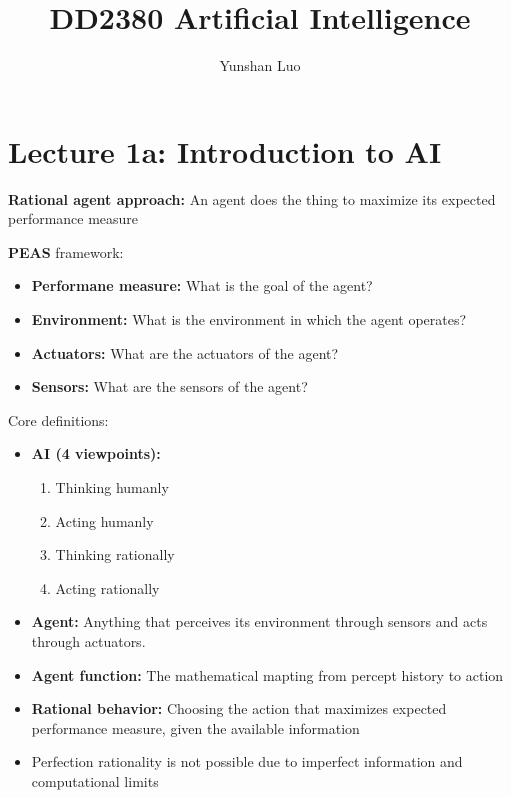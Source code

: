 \documentclass[12pt,a4paper]{article}
\begin{document}
\author{Yunshan Luo}
\title{DD2380 Artificial Intelligence}
\maketitle
\newpage

\section{Lecture 1a: Introduction to AI}
\textbf{Rational agent approach:} An agent does the thing to maximize its expected performance measure

\vspace{10pt}
\textbf{PEAS} framework:
\begin{itemize}
    \item \textbf{Performane measure:} What is the goal of the agent?
    \item \textbf{Environment: } What is the environment in which the agent operates?
    \item \textbf{Actuators:} What are the actuators of the agent?
    \item \textbf{Sensors:} What are the sensors of the agent?
\end{itemize}

Core definitions:
\begin{itemize}
    \item \textbf{AI (4 viewpoints):} 
    \begin{enumerate}
        \item Thinking humanly
        \item Acting humanly
        \item Thinking rationally
        \item Acting rationally
    \end{enumerate}
    \item \textbf{Agent:} Anything that perceives its environment through sensors and acts through actuators.
    \item \textbf{Agent function:} The mathematical mapting from percept history to action
    \item \textbf{Rational behavior:} Choosing the action that maximizes expected performance measure, given the available information
    \item Perfection rationality is not possible due to imperfect information and computational limits 
\end{itemize}
\end{document}
